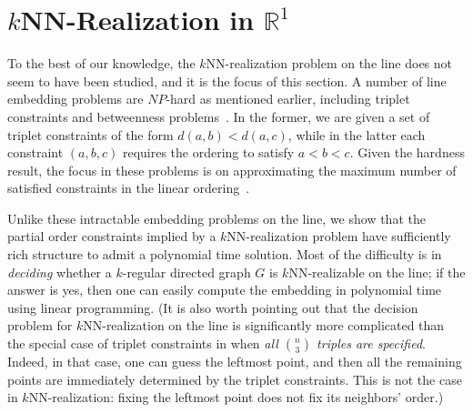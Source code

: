 \documentclass[11pt]{article}
\begin{document}
\newcommand{\coeff}[1]{C_{#1}}
\newcommand{\partcoeff}[2]{C_{#2}^{#1}}
\newcommand{\yleft}{y^-}
\newcommand{\yright}{y^+}

\section{\texorpdfstring{$k$}{k}NN-Realization in \texorpdfstring{$\mathbb{R}^1$}{R1}} \label{sec-1D}

To the best of our knowledge, the $k$NN-realization problem on the line does not seem to have been studied, and it is the focus of this section. A number of line embedding problems are $NP$-hard as mentioned earlier, including triplet constraints and betweenness problems~\cite{ChorSudan}. In the former, we are given a set of triplet constraints of the form $d(a,b) < d(a,c)$, while in the latter each constraint $(a,b,c)$ requires the ordering to satisfy $a < b < c$. Given the hardness result, the focus in these problems is on approximating the maximum number of satisfied constraints in the linear ordering~\cite{fan2020}. 

Unlike these intractable embedding problems on the line, we show that the partial order constraints implied by a $k$NN-realization problem have sufficiently  rich structure to admit a polynomial time solution. Most of the difficulty is in \emph{deciding} whether a $k$-regular directed graph $G$ is $k$NN-realizable on the line; if the answer is yes, then one can easily compute the embedding in polynomial time using linear programming.
(It is also worth pointing out that the decision problem for $k$NN-realization on the line is significantly more complicated than the special case of triplet constraints in \cite{fan2020} when \emph{all $\binom{n}{3}$ triples are specified}. Indeed, in that case, one can guess the leftmost point, and then all the remaining points are immediately determined by the triplet constraints. This is not the case in $k$NN-realization: fixing the leftmost point does not fix its neighbors' order.) 
\end{document}
